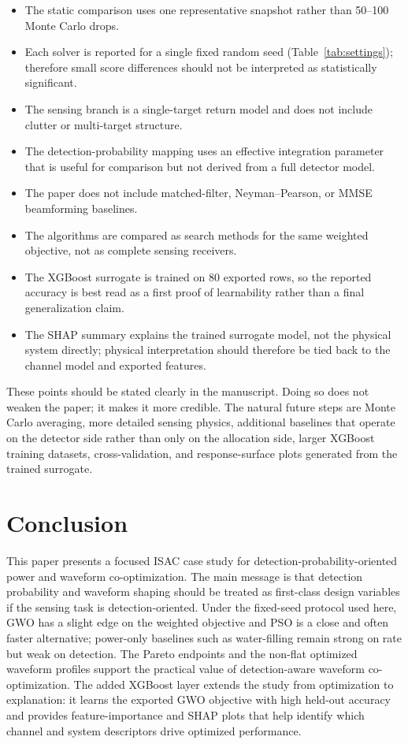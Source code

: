 \documentclass[runningheads]{llncs}
\begin{document}
\begin{itemize}
  \item The static comparison uses one representative snapshot rather than 50--100 Monte Carlo drops.
  \item Each solver is reported for a single fixed random seed (Table~\ref{tab:settings}); therefore small score differences should not be interpreted as statistically significant.
  \item The sensing branch is a single-target return model and does not include clutter or multi-target structure.
  \item The detection-probability mapping uses an effective integration parameter that is useful for comparison but not derived from a full detector model.
  \item The paper does not include matched-filter, Neyman--Pearson, or MMSE beamforming baselines.
  \item The algorithms are compared as search methods for the same weighted objective, not as complete sensing receivers.
  \item The XGBoost surrogate is trained on 80 exported rows, so the reported accuracy is best read as a first proof of learnability rather than a final generalization claim.
  \item The SHAP summary explains the trained surrogate model, not the physical system directly; physical interpretation should therefore be tied back to the channel model and exported features.
\end{itemize}

These points should be stated clearly in the manuscript. Doing so does not weaken the paper; it makes it more credible. The natural future steps are Monte Carlo averaging, more detailed sensing physics, additional baselines that operate on the detector side rather than only on the allocation side, larger XGBoost training datasets, cross-validation, and response-surface plots generated from the trained surrogate.

\section{Conclusion}
This paper presents a focused ISAC case study for detection-probability-oriented power and waveform co-optimization. The main message is that detection probability and waveform shaping should be treated as first-class design variables if the sensing task is detection-oriented. Under the fixed-seed protocol used here, GWO has a slight edge on the weighted objective and PSO is a close and often faster alternative; power-only baselines such as water-filling remain strong on rate but weak on detection. The Pareto endpoints and the non-flat optimized waveform profiles support the practical value of detection-aware waveform co-optimization. The added XGBoost layer extends the study from optimization to explanation: it learns the exported GWO objective with high held-out accuracy and provides feature-importance and SHAP plots that help identify which channel and system descriptors drive optimized performance.
\end{document}
